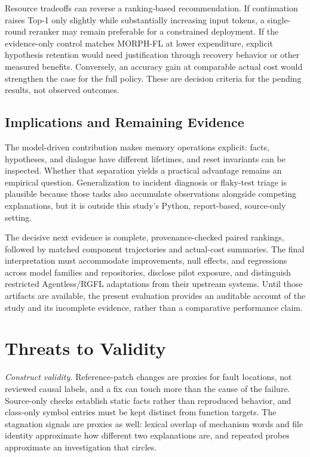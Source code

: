 \documentclass[letterpaper,journal]{IEEEtran}
\begin{document}
Resource tradeoffs can reverse a ranking-based recommendation. If continuation raises Top-1 only slightly while substantially increasing input tokens, a single-round reranker may remain preferable for a constrained deployment. If the evidence-only control matches MORPH-FL at lower expenditure, explicit hypothesis retention would need justification through recovery behavior or other measured benefits. Conversely, an accuracy gain at comparable actual cost would strengthen the case for the full policy. These are decision criteria for the pending results, not observed outcomes.

\subsection{Implications and Remaining Evidence}
The model-driven contribution makes memory operations explicit: facts, hypotheses, and dialogue have different lifetimes, and reset invariants can be inspected. Whether that separation yields a practical advantage remains an empirical question. Generalization to incident diagnosis or flaky-test triage is plausible because those tasks also accumulate observations alongside competing explanations, but it is outside this study's Python, report-based, source-only setting.

The decisive next evidence is complete, provenance-checked paired rankings, followed by matched component trajectories and actual-cost summaries. The final interpretation must accommodate improvements, null effects, and regressions across model families and repositories, disclose pilot exposure, and distinguish restricted Agentless/RGFL adaptations from their upstream systems. Until those artifacts are available, the present evaluation provides an auditable account of the study and its incomplete evidence, rather than a comparative performance claim.

\section{Threats to Validity}\label{sec:threats}
\emph{Construct validity.} Reference-patch changes are proxies for fault locations, not reviewed causal labels, and a fix can touch more than the cause of the failure. Source-only checks establish static facts rather than reproduced behavior, and class-only symbol entries must be kept distinct from function targets. The stagnation signals are proxies as well: lexical overlap of mechanism words and file identity approximate how different two explanations are, and repeated probes approximate an investigation that circles.
\end{document}
